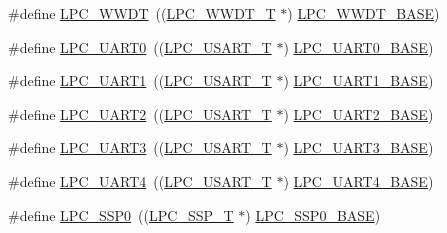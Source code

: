 \begin{DoxyCompactItemize}
\item 
\#define \hyperlink{group__PERIPH__177X__8X__BASE_ga235e068b1412366044449dba68194c55}{L\-P\-C\-\_\-\-W\-W\-D\-T}~((\hyperlink{structLPC__WWDT__T}{L\-P\-C\-\_\-\-W\-W\-D\-T\-\_\-\-T}             $\ast$) \hyperlink{group__PERIPH__407X__8X__BASE_ga9b83c39ba53f9c9e87974984c96e35de}{L\-P\-C\-\_\-\-W\-W\-D\-T\-\_\-\-B\-A\-S\-E})
\item 
\#define \hyperlink{group__PERIPH__177X__8X__BASE_ga6ba29f0f9b8af2f72e303533185bcc82}{L\-P\-C\-\_\-\-U\-A\-R\-T0}~((\hyperlink{structLPC__USART__T}{L\-P\-C\-\_\-\-U\-S\-A\-R\-T\-\_\-\-T}            $\ast$) \hyperlink{group__PERIPH__407X__8X__BASE_gaa96fb70405a1298b350fc6f0ad0af997}{L\-P\-C\-\_\-\-U\-A\-R\-T0\-\_\-\-B\-A\-S\-E})
\item 
\#define \hyperlink{group__PERIPH__177X__8X__BASE_ga83ea0dab4dcb7411c2e1de20050a4d2d}{L\-P\-C\-\_\-\-U\-A\-R\-T1}~((\hyperlink{structLPC__USART__T}{L\-P\-C\-\_\-\-U\-S\-A\-R\-T\-\_\-\-T}            $\ast$) \hyperlink{group__PERIPH__407X__8X__BASE_ga18e8f96b25e3f343bdd7ba552ae7a617}{L\-P\-C\-\_\-\-U\-A\-R\-T1\-\_\-\-B\-A\-S\-E})
\item 
\#define \hyperlink{group__PERIPH__177X__8X__BASE_gac8badf231948fc9216d416c71a34e924}{L\-P\-C\-\_\-\-U\-A\-R\-T2}~((\hyperlink{structLPC__USART__T}{L\-P\-C\-\_\-\-U\-S\-A\-R\-T\-\_\-\-T}            $\ast$) \hyperlink{group__PERIPH__407X__8X__BASE_ga8c3873ab74db743465b038c74b365281}{L\-P\-C\-\_\-\-U\-A\-R\-T2\-\_\-\-B\-A\-S\-E})
\item 
\#define \hyperlink{group__PERIPH__177X__8X__BASE_ga61c2bf57d66b50108cdec6878f9e8ee5}{L\-P\-C\-\_\-\-U\-A\-R\-T3}~((\hyperlink{structLPC__USART__T}{L\-P\-C\-\_\-\-U\-S\-A\-R\-T\-\_\-\-T}            $\ast$) \hyperlink{group__PERIPH__407X__8X__BASE_gac8dc517d5e03d4ca7666c18c89d5052e}{L\-P\-C\-\_\-\-U\-A\-R\-T3\-\_\-\-B\-A\-S\-E})
\item 
\#define \hyperlink{group__PERIPH__177X__8X__BASE_gac023ca54f076d863ce21045365ebca63}{L\-P\-C\-\_\-\-U\-A\-R\-T4}~((\hyperlink{structLPC__USART__T}{L\-P\-C\-\_\-\-U\-S\-A\-R\-T\-\_\-\-T}            $\ast$) \hyperlink{group__PERIPH__407X__8X__BASE_ga52bf68ce53e20c93366ba5496e98f5c8}{L\-P\-C\-\_\-\-U\-A\-R\-T4\-\_\-\-B\-A\-S\-E})
\item 
\#define \hyperlink{group__PERIPH__177X__8X__BASE_gac213e0325a8e8a972bd2e0dd6ccf353c}{L\-P\-C\-\_\-\-S\-S\-P0}~((\hyperlink{structLPC__SSP__T}{L\-P\-C\-\_\-\-S\-S\-P\-\_\-\-T}              $\ast$) \hyperlink{group__PERIPH__407X__8X__BASE_ga53fb1af80b541545988f2a966681abfd}{L\-P\-C\-\_\-\-S\-S\-P0\-\_\-\-B\-A\-S\-E})

\end{DoxyCompactItemize}
